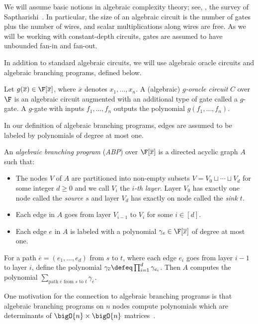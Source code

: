 \documentclass[letterpaper, 11pt]{amsart}
\begin{document}
We will assume basic notions in algebraic complexity theory; see, \eg, the survey of Saptharishi~\cite{Sap21}.
In particular, the size of an algebraic circuit is the number of gates plus the number of wires, and scalar multiplications along wires are free.
As we will be working with constant-depth circuits, gates are assumed to have unbounded fan-in and fan-out.

In addition to standard algebraic circuits, we will use algebraic oracle circuits and algebraic branching programs, defined below.
\begin{defn}\label{defn:oracle_ckt}
Let $g(\overline{x}) \in \F[\overline{x}]$, where $\overline{x}$ denotes $x_1, \ldots, x_n$.  
A (algebraic) \emph{$g$-oracle circuit} $C$ over $\F$ is an algebraic circuit augmented with an additional type of gate called a $g$-gate.  
A $g$-gate with inputs $f_1,\dots,f_n$ outputs the polynomial $g(f_1,\dots,f_n)$.
\end{defn}

In our definition of algebraic branching programs, edges are assumed to be labeled by polynomials of degree at most one.
\begin{defn}\label{defn:ABP}
    An \emph{algebraic branching program} (\emph{ABP}) over $\F[\overline{x}]$ is a directed acyclic graph $A$ such that:
    \begin{itemize}
        \item The nodes $V$ of $A$ are partitioned into non-empty subsets $V = V_0 \sqcup \cdots \sqcup V_d$ for some integer $d\geq 0$ and we call $V_i$ the \emph{$i$-th layer}.
              Layer $V_0$ has exactly one node called the \emph{source $s$} and layer $V_d$ has exactly on node called the \emph{sink $t$}.
        \item Each edge in $A$ goes from layer $V_{i-1}$ to $V_i$ for some $i\in [d]$.
        \item Each edge $e$ in $A$ is labeled with a polynomial $\gamma_e \in \F[\overline{x}]$ of degree at most one.
    \end{itemize}
    For a path $\overline{e} = (e_1, \ldots, e_d)$ from $s$ to $t$, where each edge $e_i$ goes from layer $i - 1$ to layer $i$, define the polynomial $\gamma_{\overline{e}} \defeq \prod_{i = 1}^d \gamma_{e_i}$.
    Then $A$ computes the polynomial $\sum_{\text{path } \overline{e} \text{ from } s \text{ to } t} \gamma_{\overline{e}}$.
\end{defn}
One motivation for the connection to algebraic branching programs is that algebraic branching programs on $n$ nodes compute polynomials which are determinants of $\bigO{n} \times \bigO{n}$ matrices~\cite[Theorem 1]{Val79}.
\end{document}
